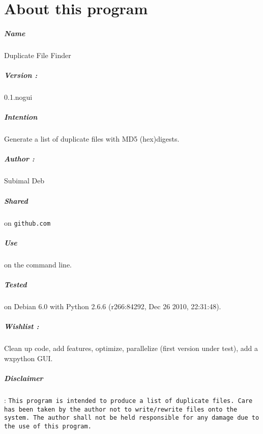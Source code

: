 \chapter*{About this program}
\paragraph{Name} Duplicate File Finder
\paragraph{Version : } 0.1.nogui
\paragraph{Intention} Generate a list of duplicate files with MD5 (hex)digests. 
\paragraph{Author : } Subimal Deb
\paragraph{Shared} on {\tt github.com}
\paragraph{Use} on the command line.
\paragraph{Tested} on Debian 6.0 with Python 2.6.6 (r266:84292, Dec 26 2010, 22:31:48).
\paragraph{Wishlist :} Clean up code, add features, optimize, parallelize (first version under test), add a wxpython GUI.
\vfill
\paragraph{Disclaimer}: {\tt This program is intended to produce a list of duplicate files. Care has been taken by the author not to write/rewrite files onto the system. The author shall not be held responsible for any damage due to the use of this program. }
